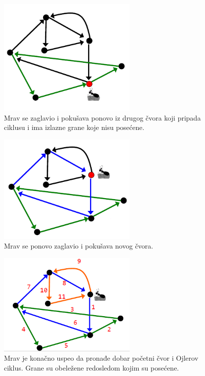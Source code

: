 \begin{figure}[H]
	\centering
	\includegraphics[width=0.6\textwidth]{poglavlja/3/slike/mrav2.png}
	\caption{Mrav se zaglavio i pokušava ponovo iz drugog čvora koji pripada ciklusu i ima izlazne grane koje nisu posećene.}
	\label{slika:mrav2}
\end{figure} 


\begin{figure}[H]
	\centering
	\includegraphics[width=0.6\textwidth]{poglavlja/3/slike/mrav3.png}
	\caption{Mrav se ponovo zaglavio i pokušava novog čvora.}
	\label{slika:mrav3}
\end{figure} 


\begin{figure}[H]
	\centering
	\includegraphics[width=0.6\textwidth]{poglavlja/3/slike/mrav4.png}
	\caption{Mrav je konačno uspeo da pronađe dobar početni čvor i Ojlerov ciklus. Grane su obeležene redosledom kojim su posećene.}
	\label{slika:mrav4}
\end{figure} 


